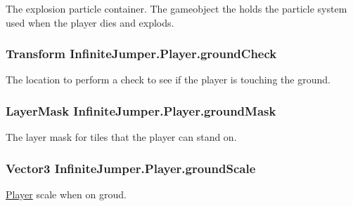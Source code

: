 The explosion particle container. The gameobject the holds the particle system used when the player dies and explods. 

\hypertarget{class_infinite_jumper_1_1_player_adaea323de33b7c4094ba8a23fa534f5d}{}
\subsubsection[{ground\+Check}]{\setlength{\rightskip}{0pt plus 5cm}Transform Infinite\+Jumper.\+Player.\+ground\+Check}\label{class_infinite_jumper_1_1_player_adaea323de33b7c4094ba8a23fa534f5d}


The location to perform a check to see if the player is touching the ground. 

\hypertarget{class_infinite_jumper_1_1_player_a914142cd34011ec8ac1a5482d56d2548}{}
\subsubsection[{ground\+Mask}]{\setlength{\rightskip}{0pt plus 5cm}Layer\+Mask Infinite\+Jumper.\+Player.\+ground\+Mask}\label{class_infinite_jumper_1_1_player_a914142cd34011ec8ac1a5482d56d2548}


The layer mask for tiles that the player can stand on. 

\hypertarget{class_infinite_jumper_1_1_player_a03193a80fd21092d462ae40241eb77a5}{}
\subsubsection[{ground\+Scale}]{\setlength{\rightskip}{0pt plus 5cm}Vector3 Infinite\+Jumper.\+Player.\+ground\+Scale}\label{class_infinite_jumper_1_1_player_a03193a80fd21092d462ae40241eb77a5}


\hyperlink{class_infinite_jumper_1_1_player}{Player} scale when on groud. 

\hypertarget{class_infinite_jumper_1_1_player_a531c3b41299bee812c3c1eb918749d1a}{}
